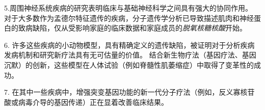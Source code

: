 5.周围神经系统疾病的研究表明临床与基础神经科学之间具有强大的协同作用。
对于大多数作为孟德尔特征遗传的疾病，分子遗传学分析已导致描述肌肉和神经蛋白的致病缺陷，仅从受影响家庭的临床数据和家庭成员的\textit{脱氧核糖核酸}开始。


6. 许多这些疾病的小动物模型，具有精确定义的遗传缺陷，被证明对于分析疾病发病机制和研究新疗法具有无可估量的价值。
结合新生物疗法（基因疗法、基因沉默）的创新，这些模型在人体试验（例如脊髓性肌萎缩症）中取得了变革性的成功。


7. 在其中一些疾病中，增强突变基因功能的新一代分子疗法（例如，反义寡核苷酸或病毒介导的基因传递）正在显着改善临床结果。


